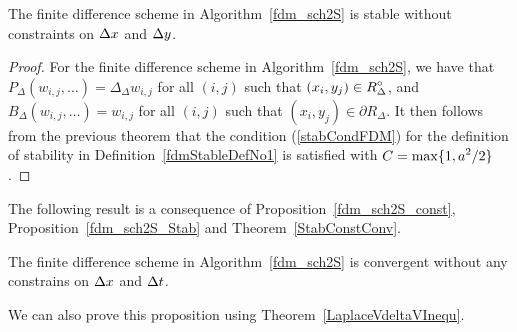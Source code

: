 \begin{prop} \label{fdm_sch2S_Stab}
The finite difference scheme in Algorithm~\ref{fdm_sch2S} is stable
without constraints on $\Delta{x}$ and $\Delta{y}$.
\end{prop}

\begin{proof}
For the finite difference scheme in Algorithm~\ref{fdm_sch2S}, we
have that
$P_\Delta(w_{i,j}, \ldots) = \Delta_\Delta w_{i,j}$ for all $(i,j)$ such
that $\displaystyle (x_i,y_j) \in R^\circ_\Delta$,  and 
$B_\Delta(w_{i,j}, \ldots) = w_{i,j}$ for all $(i,j)$ such
that $(x_i,y_j) \in \partial R_\Delta$.  It then follows from the
previous theorem that the condition (\ref{stabCondFDM}) for the
definition of stability in Definition~\ref{fdmStableDefNo1} is satisfied
with $\displaystyle C = \max \{ 1, a^2/2\}$.
\end{proof}

The following result is a consequence of Proposition~\ref{fdm_sch2S_const},
Proposition~\ref{fdm_sch2S_Stab} and Theorem~\ref{StabConstConv}.

\begin{prop}
The finite difference scheme in Algorithm~\ref{fdm_sch2S} is
convergent without any constrains on $\Delta{x}$ and $\Delta{t}$.
\end{prop}

We can also prove this proposition using Theorem~\ref{LaplaceVdeltaVInequ}.

